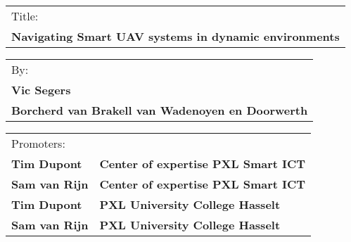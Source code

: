 \begin{tabularx}{\textwidth}{l}
  Title:\\
  \textbf{Navigating Smart UAV systems in dynamic environments}\\
\end{tabularx}

\begin{tabularx}{\textwidth}{l}
  By:\\
  \textbf{Vic Segers}\\
  \textbf{Borcherd van Brakell van Wadenoyen en Doorwerth}\\
\end{tabularx}

\begin{tabularx}{\textwidth}{l X}
  Promoters:\\
  \textbf{Tim Dupont} & \textbf{Center of expertise PXL Smart ICT}\\
  \textbf{Sam van Rijn} & \textbf{Center of expertise PXL Smart ICT}\\
  \textbf{Tim Dupont} & \textbf{PXL University College Hasselt}\\
  \textbf{Sam van Rijn} & \textbf{PXL University College Hasselt}\\
  \hline
\end{tabularx}